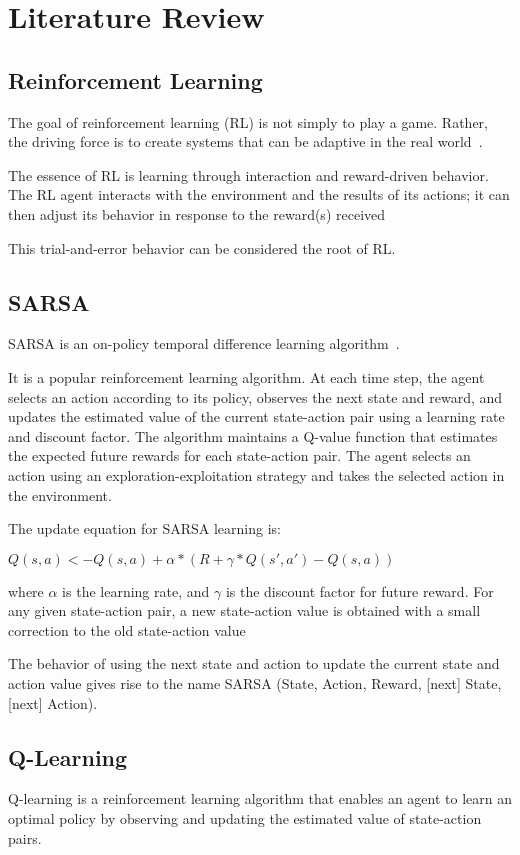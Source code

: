 \section{Literature Review}

\subsection{Reinforcement Learning}
The goal of reinforcement learning (RL) is not simply to play a game. Rather, the driving force is to create systems that can be adaptive in the real world~\cite{Arulkumaran_2017}.

The essence of RL is learning through interaction and reward-driven behavior. The RL agent interacts with the environment and the results of its actions; it can then adjust its behavior in
response to the reward(s) received~\citep{Arulkumaran_2017}

This trial-and-error behavior can be considered the root of RL.

\subsection{SARSA}
SARSA is an on-policy temporal difference learning algorithm~\citep{sutton2018reinforcement}.

It is a popular reinforcement learning algorithm. At each time step, the agent selects an action according to its policy, observes the next state and reward, and updates the estimated value of the current state-action pair using a learning rate and discount factor. 
The algorithm maintains a Q-value function that estimates the expected future rewards for each state-action pair. The agent selects an action using an exploration-exploitation strategy and takes the selected action in the environment.

The update equation for SARSA learning is:

$Q(s,a) <- Q(s,a) + \alpha*(R + \gamma*Q(s',a') - Q(s,a))$

where $\alpha$ is the learning rate, and $\gamma$ is the discount factor for future reward. For any given state-action pair, a new state-action value is obtained
with a small correction to the old state-action value~\citep{graepel2004learning}

The behavior of using the next state and action to update the current state and action value gives rise to the name SARSA (State, Action, Reward, [next] State, [next] Action).

\subsection{Q-Learning}
Q-learning is a reinforcement learning algorithm that enables an agent to learn an optimal policy by observing and updating the estimated value of state-action pairs.

